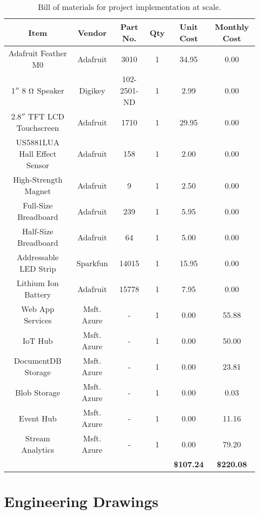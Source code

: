 \begin{table}[h]
\begin{center}
\begin{tabular}{|c|c|c|c|c|c|}\hline
    \bf Item & \bf Vendor & \bf Part No. & \bf Qty & \bf Unit Cost & \bf Monthly Cost \\\hline\hline
    Adafruit Feather M0 & Adafruit & 3010 & 1 & 34.95 & 0.00 \\\hline
    1$''$ 8 $\ohm$ Speaker & Digikey & 102-2501-ND & 1 & 2.99 & 0.00 \\\hline
    2.8$''$ TFT LCD Touchscreen & Adafruit & 1710 & 1 & 29.95 & 0.00 \\\hline
    US5881LUA Hall Effect Sensor & Adafruit & 158 & 1 & 2.00 & 0.00 \\\hline
    High-Strength Magnet & Adafruit & 9 & 1 & 2.50 & 0.00 \\\hline
    Full-Size Breadboard & Adafruit & 239 & 1 & 5.95 & 0.00 \\\hline
    Half-Size Breadboard & Adafruit & 64 & 1 & 5.00 & 0.00 \\\hline
    Addressable LED Strip & Sparkfun & 14015 & 1 & 15.95 & 0.00 \\\hline
    Lithium Ion Battery & Adafruit & 15778 & 1 & 7.95 & 0.00 \\\hline
    Web App Services & Msft. Azure & - & 1 & 0.00 & 55.88 \\\hline
    IoT Hub & Msft. Azure & - & 1 & 0.00 & 50.00 \\\hline
    DocumentDB Storage & Msft. Azure & - & 1 & 0.00 & 23.81 \\\hline
    Blob Storage & Msft. Azure & - & 1 & 0.00 & 0.03 \\\hline
    Event Hub & Msft. Azure & - & 1 & 0.00 & 11.16 \\\hline
    Stream Analytics & Msft. Azure & - & 1 & 0.00 & 79.20 \\\hline\hline
    & & & & \bf \$107.24 & \bf \$220.08 \\\hline
\end{tabular}
\caption{Bill of materials for project implementation at scale.}
\label{tab:bill-of-materials}
\end{center}
\end{table}

\section{Engineering Drawings} \label{app:cad}

